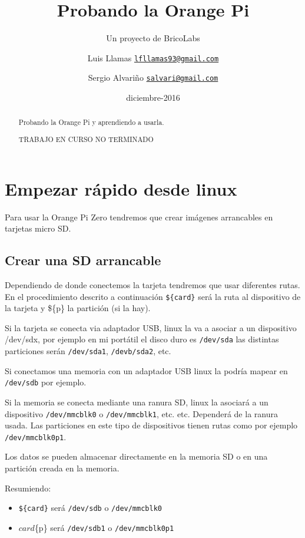 \documentclass[12pt,spanish,]{scrartcl}
\title{Probando la Orange Pi}
\subtitle{Un proyecto de BricoLabs}
\author{Luis Llamas
\href{mailto:lfllamas93@gmail.com}{\nolinkurl{lfllamas93@gmail.com}} \and Sergio Alvariño
\href{mailto:salvari@gmail.com}{\nolinkurl{salvari@gmail.com}}}
\institute{BricoLabs}
\date{diciembre-2016}
\providecommand{\tightlist}{%
  \setlength{\itemsep}{0pt}\setlength{\parskip}{0pt}}
\begin{document}
\maketitle
\begin{abstract}
Probando la Orange Pi y aprendiendo a usarla.

TRABAJO EN CURSO NO TERMINADO
\end{abstract}

{
\hypersetup{linkcolor=black}
\setcounter{tocdepth}{3}
\tableofcontents
}
\section{Empezar rápido desde
linux}\label{empezar-ruxe1pido-desde-linux}

Para usar la Orange Pi Zero tendremos que crear imágenes arrancables en
tarjetas micro SD.

\subsection{Crear una SD arrancable}\label{crear-una-sd-arrancable}

Dependiendo de donde conectemos la tarjeta tendremos que usar diferentes
rutas. En el procedimiento descrito a continuación \texttt{\$\{card\}}
será la ruta al dispositivo de la tarjeta y \$\{p\} la partición (si la
hay).

Si la tarjeta se conecta via adaptador USB, linux la va a asociar a un
dispositivo /dev/sdx, por ejemplo en mi portátil el disco duro es
\texttt{/dev/sda} las distintas particiones serán \texttt{/dev/sda1},
\texttt{/devb/sda2}, etc.

Si conectamos una memoria con un adaptador USB linux la podría mapear en
\texttt{/dev/sdb} por ejemplo.

Si la memoria se conecta mediante una ranura SD, linux la asociará a un
dispositivo \texttt{/dev/mmcblk0} o \texttt{/dev/mmcblk1}, etc. etc.
Dependerá de la ranura usada. Las particiones en este tipo de
dispositivos tienen rutas como por ejemplo \texttt{/dev/mmcblk0p1}.

Los datos se pueden almacenar directamente en la memoria SD o en una
partición creada en la memoria.

Resumiendo:

\begin{itemize}
\tightlist
\item
  \texttt{\$\{card\}} será \texttt{/dev/sdb} o \texttt{/dev/mmcblk0}
\item
  \({card}\)\{p\} será \texttt{/dev/sdb1} o \texttt{/dev/mmcblk0p1}
\end{itemize}
\end{document}
